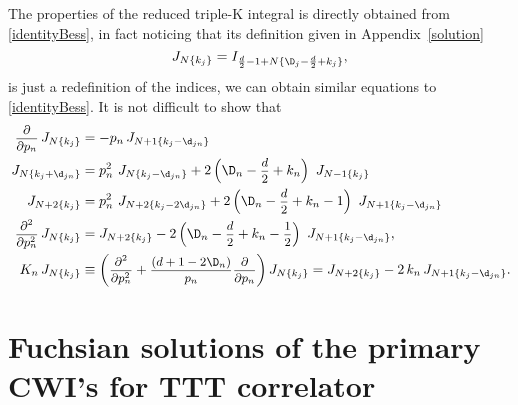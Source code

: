 \documentclass[a4paper,11pt,openright,twoside]{book}
\newcommand{\sdfrac}[2]{\mbox{\small$\displaystyle\frac{#1}{#2}$}}
\newcommand{\appref}[1]{Appendix~\ref{#1}}		%
\numberwithin{equation}{section}
\begin{document}
{{The properties of the reduced triple-K integral is directly obtained from \eqref{identityBess}, in fact noticing that its definition given in \appref{solution} 
\begin{equation}
	J_{N\{k_j\}}=I_{\frac{d}{2}-1+N\{\D_j-\frac{d}{2}+k_j\}},
\end{equation}
is just a redefinition of the indices, we can obtain similar equations to \eqref{identityBess}. It is not difficult to show that
\begin{align}
	\sdfrac{\partial}{\partial p_n}\,J_{N\{k_j\}}&=-p_n\,J_{N+1\{k_j-\d_{jn}\}}\label{1dJ}\\
	\,J_{N\{k_j+\d_{jn}\}}&=p^2_n\ J_{N\{k_j-\d_{jn}\}}+2\left(\D_n-\sdfrac{d}{2}+k_n\right)\ J_{N-1\{k_j\}}\\
	\,J_{N+2\{k_j\}}&=p^2_n\ J_{N+2\{k_j-2\d_{jn}\}}+2\left(\D_n-\sdfrac{d}{2}+k_n-1\right)\ J_{N+1\{k_j-\d_{jn}\}}\\
	\sdfrac{\partial^2}{\partial p_n^2}\,J_{N\{k_j\}}&=J_{N+2\{k_j\}}-2\left(\D_n-\sdfrac{d}{2}+k_n-\sdfrac{1}{2}\right)\ J_{N+1\{k_j-\d_{jn}\}},\\
	K_n\,J_{N\{k_j\}}&\equiv\left(\sdfrac{\partial^2}{\partial p_n^2}+\sdfrac{(d+1-2\D_n)}{p_n}\sdfrac{\partial}{\partial p_n}\right)J_{N\{k_j\}}=J_{N+2\{k_j\}}-2\,k_n\,J_{N+1\{k_j-\d_{jn}\}}\label{Fund}.
\end{align}
\section{Fuchsian solutions of the primary CWI's for TTT correlator}
\label{fuchsTTT}
}}
\end{document}

